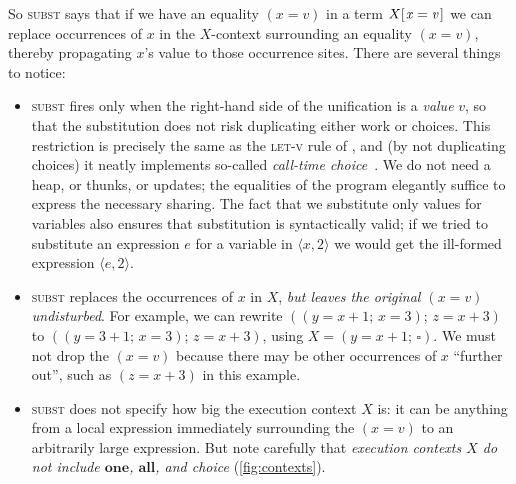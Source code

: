 \documentclass[acmsmall,review,dvipsnames]{acmart}
\newcommand{\Varid}[1]{\mathit{#1}}
\newcommand{\rulename}[1]{\textsc{\small #1}}
\newcommand{\hole}{\square}
\begin{document}
So \rulename{subst} says that if we have an equality \ensuremath{(\Varid{x}\mathrel{=}\Varid{v})} in a term \ensuremath{X [\mskip1.5mu \Varid{x}\mathrel{=}\Varid{v}\mskip1.5mu]}
we can replace occurrences of \ensuremath{\Varid{x}} in the
\ensuremath{X}-context surrounding an equality \ensuremath{(\Varid{x}\mathrel{=}\Varid{v})}, thereby propagating \ensuremath{\Varid{x}}'s value to those occurrence sites.
There are several things to notice:
\begin{itemize}
\item \rulename{subst} fires only when the right-hand side of the unification is a \emph{value} \ensuremath{\Varid{v}},
so that the substitution does not risk duplicating either work or choices. This
restriction is precisely the same as the \rulename{let-v} rule of \cite{ariola:call-by-need},
and (by not duplicating choices) it neatly implements so-called \emph{call-time choice}~\cite{hanus:survey}.
We do not need a heap, or thunks, or updates; the equalities of the program elegantly
suffice to express the necessary sharing.
The fact that we substitute only values for variables also ensures that substitution is syntactically
valid; if we tried to substitute an expression \ensuremath{\Varid{e}} for a variable in \ensuremath{\langle{}\Varid{x},\mathrm{2}\rangle} we would get the
ill-formed expression \ensuremath{\langle{}\Varid{e},\mathrm{2}\rangle}.
\item \rulename{subst}
  replaces the occurrences of \ensuremath{\Varid{x}} in \ensuremath{X}, \emph{but leaves the original \ensuremath{(\Varid{x}\mathrel{=}\Varid{v})} undisturbed}.
  For example, we can rewrite \ensuremath{((\Varid{y}\mathrel{=}\Varid{x}\mathbin{+}\mathrm{1};\,\Varid{x}\mathrel{=}\mathrm{3});\,\Varid{z}\mathrel{=}\Varid{x}\mathbin{+}\mathrm{3})} to \ensuremath{((\Varid{y}\mathrel{=}\mathrm{3}\mathbin{+}\mathrm{1};\,\Varid{x}\mathrel{=}\mathrm{3});\,\Varid{z}\mathrel{=}\Varid{x}\mathbin{+}\mathrm{3})}, using
  \ensuremath{X\mathrel{=}(\Varid{y}\mathrel{=}\Varid{x}\mathbin{+}\mathrm{1};\,\hole)}.  We must not drop the \ensuremath{(\Varid{x}\mathrel{=}\Varid{v})} because there may be other occurrences of \ensuremath{\Varid{x}}
  ``further out'', such as \ensuremath{(\Varid{z}\mathrel{=}\Varid{x}\mathbin{+}\mathrm{3})} in this example.
\item \rulename{subst} does not specify how big the execution context \ensuremath{X} is:
  it can be anything from a local expression immediately surrounding the \ensuremath{(\Varid{x}\mathrel{=}\Varid{v})} to an
  arbitrarily large expression.
But note carefully  that \emph{execution contexts \ensuremath{X} do not include \ensuremath{\textbf{one}}, \ensuremath{\textbf{all}}, and choice} (\cref{fig:contexts}).

\end{itemize}
\end{document}
